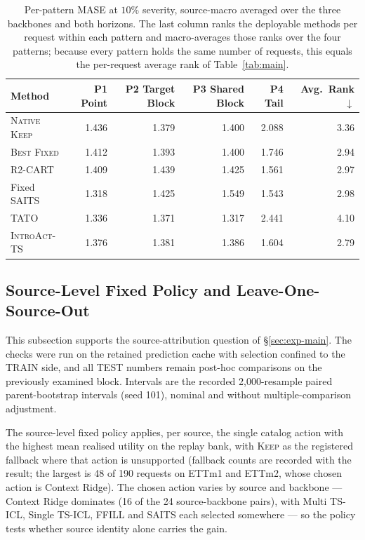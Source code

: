 \documentclass{article}
\newcommand{\introact}{\textsc{IntroAct-TS}}
\begin{document}
\begin{table}[htbp]
  \caption{Per-pattern MASE at $10\%$ severity, source-macro averaged over the three
  backbones and both horizons. The last column ranks the deployable methods per request
  within each pattern and macro-averages those ranks over the four patterns; because every
  pattern holds the same number of requests, this equals the per-request average rank of
  Table~\ref{tab:main}.}
  \label{tab:app-pattern-res}
  \centering
  \small
  \setlength{\tabcolsep}{4pt}
\begin{tabular*}{\textwidth}{@{\extracolsep{\fill}}lrrrrr@{}}
    \toprule
    Method & P1 Point & P2 Target Block & P3 Shared Block & P4 Tail & Avg.\ Rank $\downarrow$ \\
    \midrule
    \textsc{Native Keep} & 1.436 & 1.379 & 1.400 & 2.088 & 3.36 \\
    \textsc{Best Fixed}  & 1.412   & 1.393   & 1.400   & 1.746   & 2.94 \\
    R2-CART              & 1.409   & 1.439   & 1.425   & 1.561   & 2.97 \\
    Fixed SAITS & 1.318 & 1.425 & 1.549 & 1.543 & 2.98 \\
    TATO & 1.336 & 1.371 & 1.317 & 2.441 & 4.10 \\
    \midrule
    \rowcolor{bestgray}\introact{} & 1.376 & 1.381 & 1.386 & 1.604 & 2.79 \\
    \bottomrule
  \end{tabular*}
\end{table}

\subsection{Source-Level Fixed Policy and Leave-One-Source-Out}
\label{app:source-diagnostics}
This subsection supports the source-attribution question of \S\ref{sec:exp-main}. The
checks were run on the retained prediction cache with selection confined to the TRAIN
side, and all TEST numbers remain post-hoc comparisons on the previously examined block.
Intervals are the recorded 2,000-resample paired parent-bootstrap intervals (seed 101),
nominal and without multiple-comparison adjustment.

The source-level fixed policy applies, per source, the single catalog action with the
highest mean realised utility on the replay bank, with \textsc{Keep} as the registered
fallback where that action is unsupported (fallback counts are recorded with the result;
the largest is 48 of 190 requests on ETTm1 and ETTm2, whose chosen action is Context
Ridge). The chosen action varies by source and backbone — Context Ridge dominates (16 of
the 24 source-backbone pairs), with Multi TS-ICL, Single TS-ICL, FFILL and SAITS each
selected somewhere — so the policy tests whether
source identity alone carries the gain.
\end{document}
